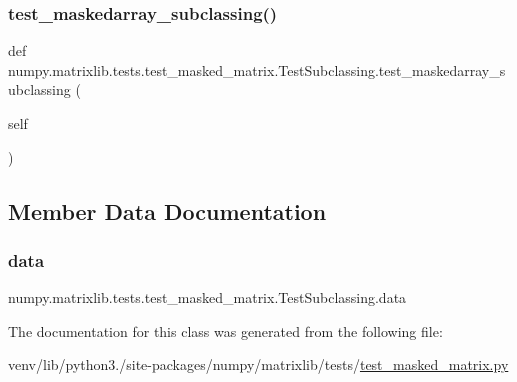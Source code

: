 \subsubsection{\texorpdfstring{test\+\_\+maskedarray\+\_\+subclassing()}{test\_maskedarray\_subclassing()}}
{\footnotesize\ttfamily def numpy.\+matrixlib.\+tests.\+test\+\_\+masked\+\_\+matrix.\+Test\+Subclassing.\+test\+\_\+maskedarray\+\_\+subclassing (\begin{DoxyParamCaption}\item[{}]{self }\end{DoxyParamCaption})}



\subsection{Member Data Documentation}
\mbox{\label{classnumpy_1_1matrixlib_1_1tests_1_1test__masked__matrix_1_1TestSubclassing_afc6746f65c5f2d113fba7598a6ccc4a7}} 
\subsubsection{\texorpdfstring{data}{data}}
{\footnotesize\ttfamily numpy.\+matrixlib.\+tests.\+test\+\_\+masked\+\_\+matrix.\+Test\+Subclassing.\+data}



The documentation for this class was generated from the following file\+:\begin{DoxyCompactItemize}
\item 
venv/lib/python3./site-\/packages/numpy/matrixlib/tests/\hyperlink{test__masked__matrix_8py}{test\+\_\+masked\+\_\+matrix.\+py}\end{DoxyCompactItemize}
